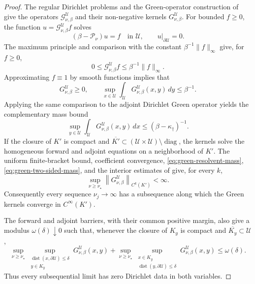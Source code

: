 \documentclass[11pt]{article}
\numberwithin{equation}{section}
\theoremstyle{plain}
\theoremstyle{definition}
\theoremstyle{remark}
\begin{document}
\begin{proof}
The regular Dirichlet problems and the Green-operator construction of
\cite[Section~6]{Bony1969} give the operators
$\mathcal G_{\nu,\beta}^{\mathscr U}$ and their non-negative kernels
$G_{\nu,\beta}^{\mathscr U}$.  For bounded $f\ge0$, the function
$u=\mathcal G_{\nu,\beta}^{\mathscr U}f$ solves
\[
(\beta-\mathscr P_\nu)u=f\quad\text{in }\mathscr U,
\qquad u|_{\partial\mathscr U}=0.
\]
The maximum principle and comparison with the constant
$\beta^{-1}\|f\|_\infty$ give, for $f\ge0$,
\[
0\le\mathcal G_{\nu,\beta}^{\mathscr U}f
\le\beta^{-1}\|f\|_\infty.
\]
Approximating $f\equiv1$ by smooth functions implies that
\begin{equation}
\label{eq:green-resolvent-mass}
G_{\nu,\beta}^{\mathscr U}\ge0,
\qquad
\sup_{x\in\mathscr U}
\int_{\mathscr U}G_{\nu,\beta}^{\mathscr U}(x,y)\,dy
\le\beta^{-1}.
\end{equation}
Applying the same comparison to the adjoint Dirichlet Green operator yields
the complementary mass bound
\begin{equation}
\label{eq:green-two-sided-mass}
\sup_{y\in\mathscr U}\int_{\mathscr U}
G_{\nu,\beta}^{\mathscr U}(x,y)\,dx
\le(\beta-\kappa_\dagger)^{-1}.
\end{equation}
If the closure of $K'$ is compact and $\overline{K'}\subset(\mathscr U\times\mathscr U)\setminus\operatorname{diag}$,
the kernels solve the homogeneous forward and adjoint equations on a
neighborhood of $K'$.  The uniform finite-bracket bound, coefficient
convergence, \eqref{eq:green-resolvent-mass},
\eqref{eq:green-two-sided-mass}, and the interior estimates of
\cite{RothschildStein1976,BramantiZhu2013} give, for every $k$,
\begin{equation}
\label{eq:green-uniform-off-diagonal-Ck}
\sup_{\nu\ge\nu_\star}
\left\|G_{\nu,\beta}^{\mathscr U}\right\|_{C^k(K')}<\infty.
\end{equation}
Consequently every sequence $\nu_j\to\infty$ has a subsequence along which
the Green kernels converge in $C^\infty(K')$.

The forward and adjoint barriers, with their common positive margin, also
give a modulus $\omega(\delta)\downarrow0$ such that, whenever the closure of $K_y$ is compact and
$\overline{K_y}\subset\mathscr U$,
\begin{equation}
\label{eq:green-uniform-boundary-modulus}
\sup_{\nu\ge\nu_\star}
\sup_{\substack{\operatorname{dist}(x,\partial\mathscr U)\le\delta\\
y\in K_y}}G_{\nu,\beta}^{\mathscr U}(x,y)
+\sup_{\nu\ge\nu_\star}
\sup_{\substack{x\in K_y\\
\operatorname{dist}(y,\partial\mathscr U)\le\delta}}
G_{\nu,\beta}^{\mathscr U}(x,y)
\le\omega(\delta).
\end{equation}
Thus every subsequential limit has zero Dirichlet data in both variables.


\end{proof}
\end{document}
